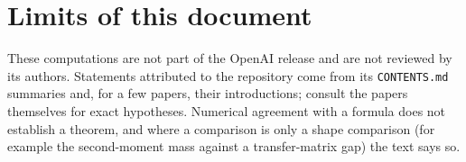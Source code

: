 \documentclass[11pt]{article}
\begin{document}
\section*{Limits of this document}
These computations are not part of the OpenAI release and are not reviewed by its authors. Statements attributed to the repository
come from its \texttt{CONTENTS.md} summaries and, for a few papers, their introductions; consult the papers themselves for exact hypotheses.
Numerical agreement with a formula does not establish a theorem, and where a comparison is only a shape comparison (for example the
second-moment mass against a transfer-matrix gap) the text says so.
\end{document}
